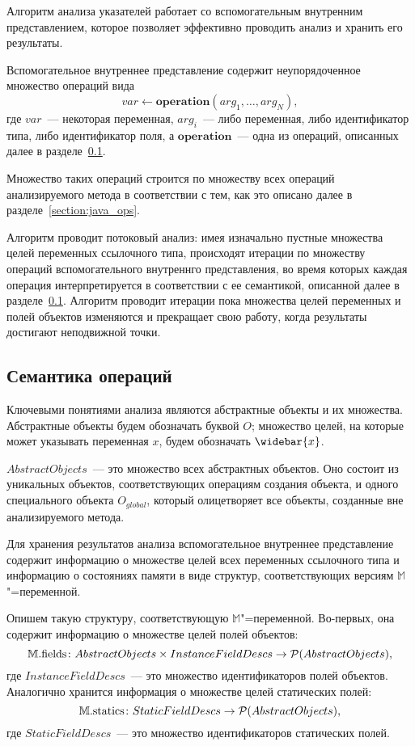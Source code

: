 \documentclass[14pt,titlepage,draft]{extarticle}
\newcommand{\M}{\ensuremath{\mathbb{M}}}
\newcommand{\Mfield}[1]{\ensuremath{\mathrm{#1}}}
\newcommand{\op}[1]{\mathbf{#1}}
\newcommand{\pts}[1]{\widebar{#1}}
\begin{document}
    Алгоритм анализа указателей работает со вспомогательным внутренним
    представлением, которое позволяет эффективно проводить анализ и хранить его
    результаты.

    Вспомогательное внутреннее представление содержит неупорядоченное множество
    операций вида
    \[ var \gets \op{operation}(arg_1, \ldots, arg_N), \]
    где $var$~--- некоторая переменная, $arg_i$~--- либо переменная, либо
    идентификатор типа, либо идентификатор поля, а $\op{operation}$~--- одна из
    операций, описанных далее в разделе~\ref{section:ops_semantic}.

    Множество таких операций строится по множеству всех операций
    анализируемого метода в соответствии с тем, как это описано далее в
    разделе~\ref{section:java_ops}.

    Алгоритм проводит потоковый анализ: имея изначально пустные
    множества целей переменных ссылочного типа, происходят итерации по
    множеству операций вспомогательного внутреннго представления, во время
    которых каждая операция интерпретируется в соответствии с ее семантикой,
    описанной далее в разделе~\ref{section:ops_semantic}. Алгоритм проводит
    итерации пока множества целей переменных и полей объектов изменяются и
    прекращает свою работу, когда результаты достигают неподвижной точки.


  \subsection{Семантика операций}
    \label{section:ops_semantic}

    Ключевыми понятиями анализа являются абстрактные объекты и их множества.
    Абстрактные объекты будем обозначать буквой $O$; множество целей, на
    которые может указывать переменная $x$, будем обозначать $\pts{x}$.

    $AbstractObjects$~--- это множество всех абстрактных объектов. Оно
    состоит из уникальных объектов, соответствующих операциям создания
    объекта, и одного специального объекта $O_{global}$, который олицетворяет
    все объекты, созданные вне анализируемого метода.

    Для хранения результатов анализа вспомогательное внутреннее представление
    содержит информацию о множестве целей всех переменных ссылочного
    типа и информацию о состояниях памяти в виде структур, соответствующих
    версиям \M"=переменной.

    Опишем такую структуру, соответствующую \M"=переменной. Во-первых, она
    содержит информацию о множестве целей полей объектов:
    \[ \M.\Mfield{fields}\colon
      AbstractObjects \times InstanceFieldDescs \to
      \powerset{AbstractObjects},
    \]
    где $InstanceFieldDescs$~--- это множество идентификаторов полей
    объектов.  Аналогично хранится информация о множестве целей статических
    полей:
    \[ \M.\Mfield{statics}\colon
      StaticFieldDescs \to \powerset{AbstractObjects},
    \]
    где $StaticFieldDescs$~--- это множество идентификаторов
    статических полей.
\end{document}
